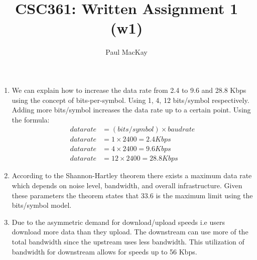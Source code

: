 \documentclass{article}
\begin{document}
\title{CSC361: Written Assignment 1 (w1)}
\author{Paul MacKay}

\maketitle

\section{}
\begin{enumerate}[label=(\alph*)]
	\item 
        We can explain how to increase the data rate from 2.4 to 9.6 and 28.8 Kbps using the concept of 
        bits-per-symbol. Using 1, 4, 12 bits/symbol respectively. Adding more bits/symbol increases 
        the data rate up to a certain point.
        Using the formula: 
        \begin{align*}
            data rate &= (bits/symbol) \times baud rate  \\
            data rate &= 1 \times 2400 = 2.4 Kbps  \\
            data rate &= 4 \times 2400 = 9.6 Kbps \\
            data rate &= 12 \times 2400 = 28.8 Kbps 
        \end{align*}

	\item 
        According to the Shannon-Hartley theorem there exists a maximum data rate 
        which depends on noise level, bandwidth, and overall infrastructure. 
        Given these parameters the theorem states that 33.6 is the maximum limit 
        using the bits/symbol model.

	\item 
        Due to the asymmetric demand for download/upload speeds i.e users download
        more data than they upload. The downstream can use more of the total bandwidth
        since the upstream uses less bandwidth. This utilization of bandwidth 
        for downstream allows for speeds up to 56 Kbps.


\end{enumerate}
\end{document}
